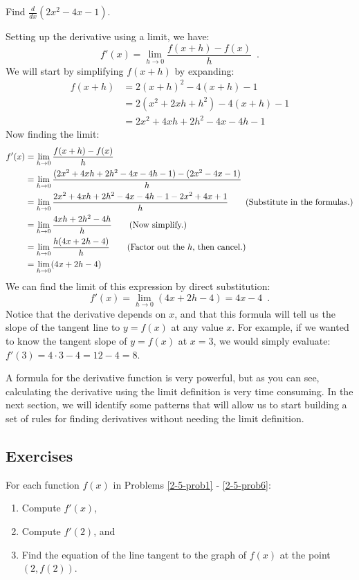 \begin{example}
Find $\frac{d}{dx}(2x^2-4x-1)$.

\begin{solution} Setting up the derivative using a limit, we have:
$$f'(x)=\lim_{h\to 0}\frac{f(x+h)-f(x)}{h} \enspace .$$
We will start by simplifying $f(x+h)$ by expanding:
\begin{align*}
		f(x+h) &= 2(x+h)^2-4(x+h)-1 \\
		&= 2(x^2+2xh+h^2)-4(x+h)-1 \\
		&= 2x^2+4xh+2h^2-4x-4h-1
	\end{align*}
Now finding the limit:
\begin{align*}
		f'(x) &= \lim_{h\to 0}\frac{f(x+h)-f(x)}{h} \\
		&= \lim_{h\to 0} \frac{(2x^2+4xh+2h^2-4x-4h-1)-(2x^2-4x-1)}{h} \\
		&= \lim_{h\to 0} \frac{2x^2+4xh+2h^2-4x-4h-1-2x^2+4x+1}{h} \qquad \text{(Substitute in the formulas.)} \\
		&= \lim_{h\to 0} \frac{4xh+2h^2-4h}{h} \qquad \text{(Now simplify.)}\\
		&= \lim_{h\to 0} \frac{h(4x+2h-4)}{h} \qquad \text{(Factor out the \( h \), then cancel.)} \\
		&= \lim_{h\to 0} (4x+2h-4)
	\end{align*}
We can find the limit of this expression by direct substitution:
$$f'(x)=\lim_{h\to 0} (4x+2h-4)=4x-4 \enspace .$$
Notice that the derivative depends on $x$, and that this formula will tell us the slope of the tangent line to $y=f(x)$ at any value $x$. For example, if we wanted to know the tangent slope of $y=f(x)$ at $x=3$, we would simply evaluate: $f'(3)=4\cdot 3-4= 12-4 = 8$.
\end{solution}\end{example}
A formula for the derivative function is very powerful, but as you can see, calculating the derivative using the limit definition is very time consuming. In the next section, we will identify some patterns that will allow us to start building a set of rules for finding derivatives without needing the limit definition.

\subsection{Exercises}
    For each function  $f(x)$  in Problems  \ref{2-5-prob1} - \ref{2-5-prob6}: 
    \begin{enumerate}[label=(\alph*)]
    \item Compute $f'(x)$,
    \item Compute $f'(2)$, and
    \item Find the equation of the line tangent to the graph of $f(x)$ at the point $(2, f(2))$.
    \end{enumerate}

